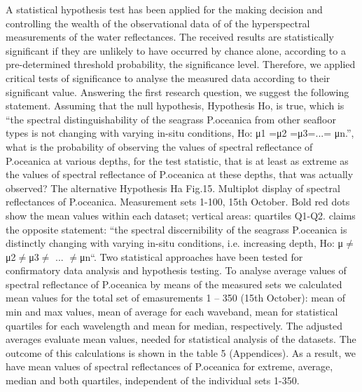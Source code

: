 \documentclass[10pt, a4paper]{article}
\begin{document}
A statistical hypothesis test has been applied for the making decision and controlling the wealth of the
observational data of of the hyperspectral measurements of the water reflectances.
The received results are statistically significant if they are unlikely to have occurred by chance alone,
according to a pre-determined threshold probability, the significance level. Therefore, we applied
critical tests of significance to analyse the measured data according to their significant value.
Answering the first research question, we suggest the following statement.
Assuming that the null hypothesis, Hypothesis Ho, is true, which is “the spectral distinguishability of
the seagrass P.oceanica from other seafloor types is not changing with varying in-situ conditions,
Ho: μ1 =μ2 =μ3=...= μn.”, what is the probability of observing the values of spectral reflectance of
P.oceanica at various depths, for the test statistic, that is at least as extreme as the values of spectral
reflectance of P.oceanica at these depths, that was actually observed? The alternative Hypothesis Ha
Fig.15. Multiplot display of spectral reflectances of P.oceanica. Measurement sets 1-100, 15th
October. Bold red dots show the mean values within each dataset; vertical areas: quartiles Q1-Q2.
claims the opposite statement: “the spectral discernibility of the seagrass P.oceanica is distinctly
changing with varying in-situ conditions, i.e. increasing depth, Ho: μ$\neq$μ2$\neq$μ3$\neq$ ... $\neq$μn“.
Two statistical approaches have been tested for confirmatory data analysis and hypothesis testing.
To analyse average values of spectral reflectance of P.oceanica by means of the measured sets we calculated 
mean values for the total set of emasurements 1 – 350 (15th October): mean of min and max values, 
mean of average for each waveband, mean for statistical quartiles for each wavelength and mean for median, respectively. 
The adjusted averages evaluate mean values, needed for statistical analysis of the datasets. 
The outcome of this calculations is shown in the table 5 (Appendices). 
As a result, we have mean values of spectral reflectances of P.oceanica for extreme, average, median and both quartiles,
independent of the individual sets 1-350. 
\end{document}
